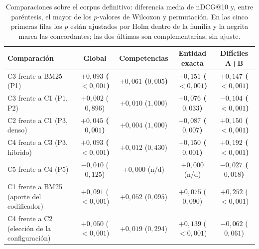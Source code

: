 \documentclass[11pt,letterpaper]{article}
\numberwithin{equation}{section}
\begin{document}
\begin{table}[htbp]
\centering
\footnotesize
\setlength{\tabcolsep}{5pt}
\renewcommand{\arraystretch}{1.25}
\caption{Comparaciones sobre el corpus definitivo: diferencia media de nDCG@10 y, entre paréntesis, el mayor de los $p$-valores de Wilcoxon y permutación. En las cinco primeras filas los $p$ están ajustados por Holm dentro de la familia y la negrita marca las concordantes; las dos últimas son complementarias, sin ajuste.}
\label{tab:final-stats}
\begin{tabularx}{\textwidth}{@{}Y c c c c@{}}
\toprule
\textbf{Comparación} & \textbf{Global} & \textbf{Competencias} & \textbf{Entidad exacta} & \textbf{Difíciles A+B} \\
\midrule
C3 frente a BM25 (P1) & {\boldmath\bfseries $+0{,}093$ ($<\!0{,}001$)} & {\boldmath\bfseries $+0{,}061$ ($0{,}005$)} & {\boldmath\bfseries $+0{,}151$ ($<\!0{,}001$)} & {\boldmath\bfseries $+0{,}147$ ($<\!0{,}001$)} \\
C3 frente a C1 (P1, P2) & $+0{,}002$ ($0{,}896$) & $+0{,}010$ ($1{,}000$) & {\boldmath\bfseries $+0{,}076$ ($0{,}033$)} & {\boldmath\bfseries $-0{,}104$ ($<\!0{,}001$)} \\
C2 frente a C1 (P3, denso) & {\boldmath\bfseries $+0{,}045$ ($0{,}001$)} & $+0{,}004$ ($1{,}000$) & {\boldmath\bfseries $+0{,}087$ ($0{,}007$)} & {\boldmath\bfseries $+0{,}150$ ($<\!0{,}001$)} \\
C4 frente a C3 (P3, híbrido) & {\boldmath\bfseries $+0{,}093$ ($<\!0{,}001$)} & $+0{,}012$ ($0{,}430$) & {\boldmath\bfseries $+0{,}150$ ($0{,}001$)} & {\boldmath\bfseries $+0{,}192$ ($<\!0{,}001$)} \\
C5 frente a C4 (P5) & $-0{,}010$ ($0{,}125$) & $+0{,}000$ (n/d) & $+0{,}000$ (n/d) & {\boldmath\bfseries $-0{,}027$ ($0{,}018$)} \\
\midrule
C1 frente a BM25 (aporte del codificador) & $+0{,}091$ ($<\!0{,}001$) & $+0{,}052$ ($0{,}095$) & $+0{,}075$ ($0{,}090$) & $+0{,}252$ ($<\!0{,}001$) \\
C4 frente a C2 (elección de la configuración) & $+0{,}050$ ($<\!0{,}001$) & $+0{,}019$ ($0{,}294$) & $+0{,}139$ ($<\!0{,}001$) & $-0{,}062$ ($0{,}061$) \\
\bottomrule
\end{tabularx}
\end{table}
\end{document}
